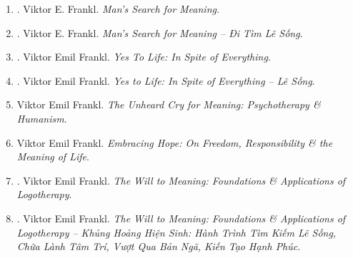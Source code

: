 \documentclass{article}
\begin{document}
\begin{enumerate}
\begin{quotation}
		-- Cuộc sống suy cho cùng có nghĩa là có trách nhiệm tìm ra câu trả lời đúng đắn cho những vấn đề của mình \& để hoàn thành những nhiệm vụ mà nó không ngừng đặt ra cho mỗi cá nhân.

		{\it``Emotion, which is suffering, ceases to be suffering as soon as we form a clear \& precise picture of it.''}

		-- Cảm xúc, tức là đau khổ, sẽ ngừng đau khổ ngay khi chúng ta hình thành 1 bức tranh rõ ràng \& chính xác về nó.

		{\it``If there is a meaning in life at all, then there must be a meaning in suffering. Suffering is an ineradicable part of life, even as fate \& death. Without suffering \& death human life cannot be complete.''}

		-- Nếu cuộc sống có ý nghĩa gì đó thì đau khổ cũng phải có ý nghĩa. Đau khổ là 1 phần không thể xóa bỏ được của cuộc sống, kể cả số phận \& cái chết. Không có đau khổ \& cái chết, cuộc sống con người không thể trọn vẹn.
	\end{quotation}

	\item \cite{Frankl_meaning_revised}. {\sc Viktor E. Frankl}. {\it Man's Search for Meaning}.\hfill{\sf[reading]}

	\item \cite{Frankl_meaning_VN}. {\sc Viktor E. Frankl}. {\it Man's Search for Meaning -- Đi Tìm Lẽ Sống}.\hfill{\sf[done]}

	\item \cite{Frankl_yes_life}. {\sc Viktor Emil Frankl}. {\it Yes To Life: In Spite of Everything}.

	\item \cite{Frankl_yes_life_VN}. {\sc Viktor Emil Frankl}. {\it Yes to Life: In Spite of Everything -- Lẽ Sống}.\hfill{\sf[done]}

	\item {\sc Viktor Emil Frankl}. {\it The Unheard Cry for Meaning: Psychotherapy \& Humanism}.

	\item {\sc Viktor Emil Frankl}. {\it Embracing Hope: On Freedom, Responsibility \& the Meaning of Life}.

	\item \cite{Frankl_will_meaning}. {\sc Viktor Emil Frankl}. {\it The Will to Meaning: Foundations \& Applications of Logotherapy}.

	\item \cite{Frankl_will_meaning_VN}. {\sc Viktor Emil Frankl}. {\it The Will to Meaning: Foundations \& Applications of Logotherapy -- Khủng Hoảng Hiện Sinh: Hành Trình Tìm Kiếm Lẽ Sống, Chữa Lành Tâm Trí, Vượt Qua Bản Ngã, Kiến Tạo Hạnh Phúc}.\hfill{\sf[done]}


\end{enumerate}
\end{document}
